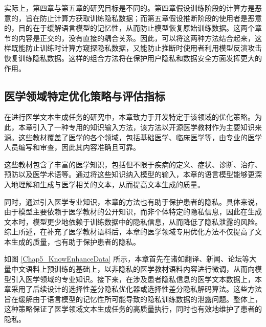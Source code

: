 实际上，第四章与第五章的研究目标是不同的。第四章假设训练阶段的计算方是恶意的，旨在防止计算方获取训练隐私数据；而第五章假设推断阶段的使用者是恶意的，目的在于缓解语言模型的记忆性，从而防止模型恢复原始训练数据。这两个章节的内容是正交的，没有直接的耦合关系。因此，可以将这两种方法结合起来，这样既能防止训练时计算方窥探隐私数据，又能防止推断时使用者利用模型反演攻击恢复训练隐私数据。这样的组合方法将在保护用户隐私和数据安全方面发挥更大的作用。

\subsection{医学领域特定优化策略与评估指标} \label{medical_domain_books}

在进行医学文本生成任务的研究中，本章致力于开发特定于该领域的优化策略。为此，本章引入了一种专用的知识输入方法，该方法以开源医学教材作为主要知识来源。这些教材覆盖了医学的各个领域，包括基础医学、临床医学等，由专业的医学人员编写和审查，因此其内容准确且可靠。

这些教材包含了丰富的医学知识，包括但不限于疾病的定义、症状、诊断、治疗、预防以及医学术语等。通过将这些知识纳入模型的输入，本章的语言模型能够更深入地理解和生成与医学相关的文本，从而提高文本生成的质量。

同时，通过引入医学专业知识，本章的方法也有助于保护患者的隐私。具体来说，由于模型主要依赖于医学教材的公开知识，而非个体特定的隐私信息，因此在生成文本时，模型更少地依赖于训练数据中的隐私信息，从而降低了隐私泄露的风险。综上所述，在补充了医学教材语料后，本章的医学领域专用优化方法不仅提高了文本生成的质量，也有助于保护患者的隐私。


如图 \ref{Chap5_KnowEnhanceData} 所示，本章首先在诸如翻译、新闻、论坛等大量中文语料上预训练的基础上，以非隐私的医学教材语料内容进行微调，从而向模型引入医学领域的专业知识。接下来，在涉及患者隐私信息的医学文本数据上，本章采用了后续设计的选择性差分隐私优化器或选择性差分隐私解码算法。这些方法旨在缓解由于语言模型的记忆性所可能导致的隐私训练数据的泄露问题。整体上，这种策略保证了医学领域文本生成任务的高质量执行，同时也有效地维护了患者的隐私。


